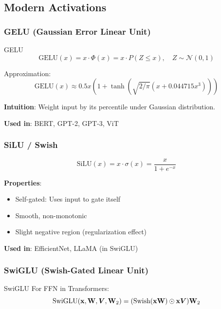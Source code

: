 \subsection{Modern Activations}

\subsubsection{GELU (Gaussian Error Linear Unit)}

\begin{mathresult}{GELU}
\begin{equation}
\text{GELU}(x) = x \cdot \Phi(x) = x \cdot P(Z \leq x), \quad Z \sim \mathcal{N}(0, 1)
\end{equation}

Approximation:
\begin{equation}
\text{GELU}(x) \approx 0.5x\left(1 + \tanh\left(\sqrt{2/\pi}(x + 0.044715x^3)\right)\right)
\end{equation}
\end{mathresult}

\textbf{Intuition}: Weight input by its percentile under Gaussian distribution.

\textbf{Used in}: BERT, GPT-2, GPT-3, ViT

\subsubsection{SiLU / Swish}

\begin{equation}
\text{SiLU}(x) = x \cdot \sigma(x) = \frac{x}{1 + e^{-x}}
\end{equation}

\textbf{Properties}:
\begin{itemize}
    \item Self-gated: Uses input to gate itself
    \item Smooth, non-monotonic
    \item Slight negative region (regularization effect)
\end{itemize}

\textbf{Used in}: EfficientNet, LLaMA (in SwiGLU)

\subsubsection{SwiGLU (Swish-Gated Linear Unit)}

\begin{mathresult}{SwiGLU}
For FFN in Transformers:
\begin{equation}
\text{SwiGLU}(\mathbf{x}, \mathbf{W}, \bm{V}, \mathbf{W}_2) = (\text{Swish}(\mathbf{x}\mathbf{W}) \odot \mathbf{x}\bm{V}) \mathbf{W}_2
\end{equation}
\end{mathresult}

